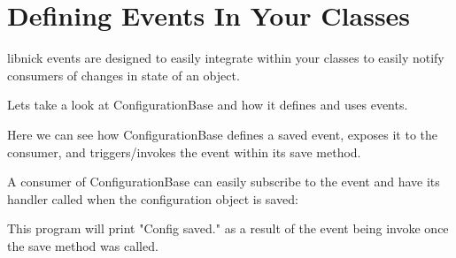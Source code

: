 \chapter{Defining Events In Your Classes}
\hypertarget{md_manual_2events}{}\label{md_manual_2events}
\label{md_manual_2events_autotoc_md1}%
%
libnick events are designed to easily integrate within your classes to easily notify consumers of changes in state of an object.

Let\textquotesingle{}s take a look at {\ttfamily Configuration\+Base} and how it defines and uses events.


\begin{DoxyCode}{0}
\DoxyCodeLine{\{}
\DoxyCodeLine{\textcolor{keyword}{public}:}
\DoxyCodeLine{\ \ \ \ \{}
\DoxyCodeLine{\ \ \ \ \}}
\DoxyCodeLine{}
\DoxyCodeLine{\ \ \ \ \{}
\DoxyCodeLine{\ \ \ \ \}}
\DoxyCodeLine{}
\DoxyCodeLine{\textcolor{keyword}{private}:}
\DoxyCodeLine{\};}

\end{DoxyCode}


Here we can see how {\ttfamily Configuration\+Base} defines a {\ttfamily saved} event, exposes it to the consumer, and triggers/invokes the event within its {\ttfamily save} method.

A consumer of {\ttfamily Configuration\+Base} can easily subscribe to the event and have its handler called when the configuration object is saved\+: 
\begin{DoxyCode}{0}
\DoxyCodeLine{\{}
\DoxyCodeLine{\}}
\DoxyCodeLine{}
\DoxyCodeLine{\{}
\DoxyCodeLine{\}}

\end{DoxyCode}


This program will print "{}\+Config saved."{} as a result of the event being invoke once the save method was called. 